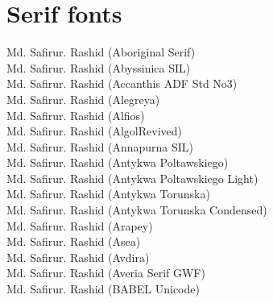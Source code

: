 \documentclass[letterpaper,11pt]{article}
\begin{document}
\section{Serif fonts}
\setmainfont{Aboriginal Serif} Md. Safirur. Rashid \qquad (Aboriginal Serif) \\
\setmainfont{Abyssinica SIL} Md. Safirur. Rashid \qquad (Abyssinica SIL) \\
\setmainfont{Accanthis ADF Std No3} Md. Safirur. Rashid \qquad (Accanthis ADF Std No3) \\
\setmainfont{Alegreya} Md. Safirur. Rashid \qquad (Alegreya) \\
\setmainfont{Alfios} Md. Safirur. Rashid \qquad (Alfios) \\
\setmainfont{AlgolRevived} Md. Safirur. Rashid \qquad (AlgolRevived) \\
\setmainfont{Annapurna SIL} Md. Safirur. Rashid \qquad (Annapurna SIL) \\
\setmainfont{Antykwa Poltawskiego} Md. Safirur. Rashid \qquad (Antykwa Poltawskiego) \\
\setmainfont{Antykwa Poltawskiego Light} Md. Safirur. Rashid \qquad (Antykwa Poltawskiego Light) \\
\setmainfont{Antykwa Torunska} Md. Safirur. Rashid \qquad (Antykwa Torunska) \\
\setmainfont{Antykwa Torunska Condensed} Md. Safirur. Rashid \qquad (Antykwa Torunska Condensed) \\
\setmainfont{Arapey} Md. Safirur. Rashid \qquad (Arapey) \\
\setmainfont{Asea} Md. Safirur. Rashid \qquad (Asea) \\
\setmainfont{Avdira} Md. Safirur. Rashid \qquad (Avdira) \\
\setmainfont{Averia Serif GWF} Md. Safirur. Rashid \qquad (Averia Serif GWF) \\
\setmainfont{BABEL Unicode} Md. Safirur. Rashid \qquad (BABEL Unicode) \\
\end{document}
